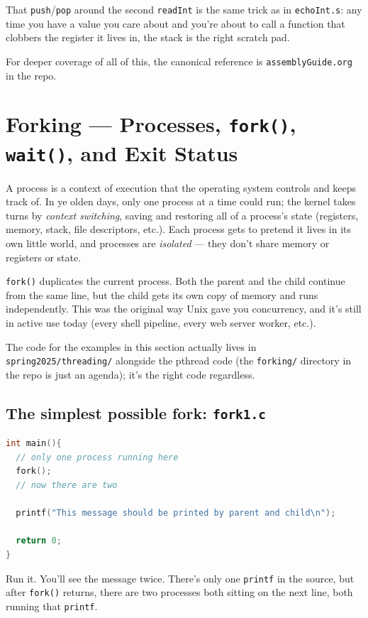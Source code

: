 \documentclass[11pt]{article}
\begin{document}
That \texttt{push}/\texttt{pop} around the second \texttt{readInt} is
the same trick as in \texttt{echoInt.s}: any time you have a value
you care about and you're about to call a function that clobbers the
register it lives in, the stack is the right scratch pad.

For deeper coverage of all of this, the canonical reference is
\texttt{assemblyGuide.org} in the repo.

\section{Forking --- Processes, \texttt{fork()}, \texttt{wait()}, and Exit Status}

A process is a context of execution that the operating system
controls and keeps track of. In ye olden days, only one process at a
time could run; the kernel takes turns by \emph{context switching},
saving and restoring all of a process's state (registers, memory,
stack, file descriptors, etc.). Each process gets to pretend it lives
in its own little world, and processes are \emph{isolated} --- they
don't share memory or registers or state.

\texttt{fork()} duplicates the current process. Both the parent and
the child continue from the same line, but the child gets its own
copy of memory and runs independently. This was the original way Unix
gave you concurrency, and it's still in active use today (every shell
pipeline, every web server worker, etc.).

The code for the examples in this section actually lives in
\texttt{spring2025/threading/} alongside the pthread code (the
\texttt{forking/} directory in the repo is just an agenda); it's the
right code regardless.

\subsection*{The simplest possible fork: \texttt{fork1.c}}

\begin{lstlisting}[language=C]
int main(){
  // only one process running here
  fork();
  // now there are two

  printf("This message should be printed by parent and child\n");

  return 0;
}
\end{lstlisting}

Run it. You'll see the message twice. There's only one
\texttt{printf} in the source, but after \texttt{fork()} returns,
there are two processes both sitting on the next line, both running
that \texttt{printf}.
\end{document}
